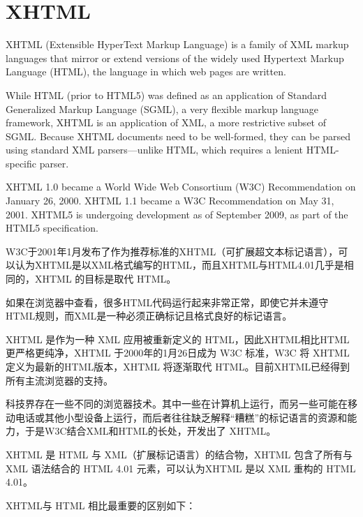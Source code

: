 \part{XHTML}


XHTML (Extensible HyperText Markup Language) is a family of XML markup languages that mirror or extend versions of the widely used Hypertext Markup Language (HTML), the language in which web pages are written.

While HTML (prior to HTML5) was defined as an application of Standard Generalized Markup Language (SGML), a very flexible markup language framework, XHTML is an application of XML, a more restrictive subset of SGML. Because XHTML documents need to be well-formed, they can be parsed using standard XML parsers—unlike HTML, which requires a lenient HTML-specific parser.

XHTML 1.0 became a World Wide Web Consortium (W3C) Recommendation on January 26, 2000. XHTML 1.1 became a W3C Recommendation on May 31, 2001. XHTML5 is undergoing development as of September 2009, as part of the HTML5 specification.

W3C于2001年1月发布了作为推荐标准的XHTML（可扩展超文本标记语言），可以认为XHTML是以XML格式编写的HTML，而且XHTML与HTML4.01几乎是相同的，XHTML 的目标是取代 HTML。



如果在浏览器中查看，很多HTML代码运行起来非常正常，即使它并未遵守HTML规则，而XML是一种必须正确标记且格式良好的标记语言。

XHTML 是作为一种 XML 应用被重新定义的 HTML，因此XHTML相比HTML更严格更纯净，XHTML 于2000年的1月26日成为 W3C 标准，W3C 将 XHTML 定义为最新的HTML版本，XHTML 将逐渐取代 HTML。目前XHTML已经得到所有主流浏览器的支持。

科技界存在一些不同的浏览器技术。其中一些在计算机上运行，而另一些可能在移动电话或其他小型设备上运行，而后者往往缺乏解释“糟糕”的标记语言的资源和能力，于是W3C结合XML和HTML的长处，开发出了 XHTML。

XHTML 是 HTML 与 XML（扩展标记语言）的结合物，XHTML 包含了所有与 XML 语法结合的 HTML 4.01 元素，可以认为XHTML 是以 XML 重构的 HTML 4.01。

XHTML与 HTML 相比最重要的区别如下：

